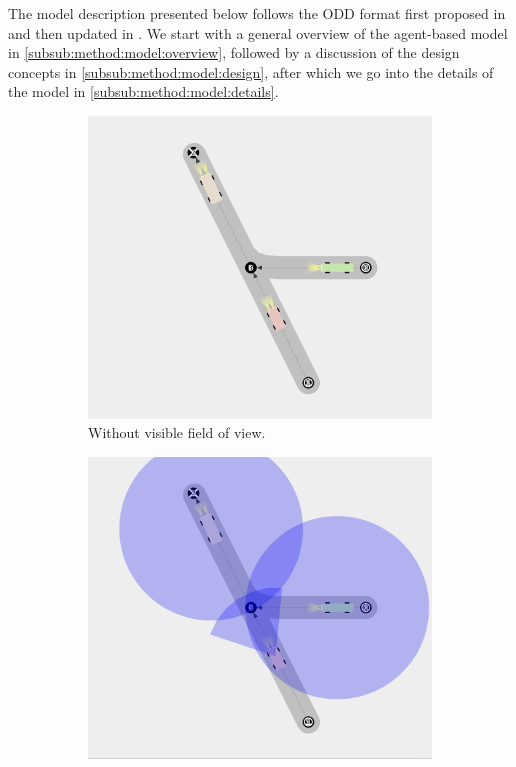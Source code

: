 The model description presented below follows the ODD format first proposed in \textcite{grimm2006standard} and then updated in \textcite{grimm2010odd}. We start with a general overview of the agent-based model in \cref{subsub:method:model:overview}, followed by a discussion of the design concepts in \cref{subsub:method:model:design}, after which we go into the details of the model in \cref{subsub:method:model:details}. 

\begin{figure}
	\centering
	\begin{subfigure}{0.49\textwidth}
		\centering
		\includegraphics[width=\textwidth]{./img/model_simulationView}
		\caption{Without visible field of view.}
		\label{fig:model:simulation:nofix}
	\end{subfigure}
	\begin{subfigure}{0.49\textwidth}
		\centering
		\includegraphics[width=\textwidth]{./img/model_simulationView_fieldOfView}

\end{subfigure}
\end{figure}
